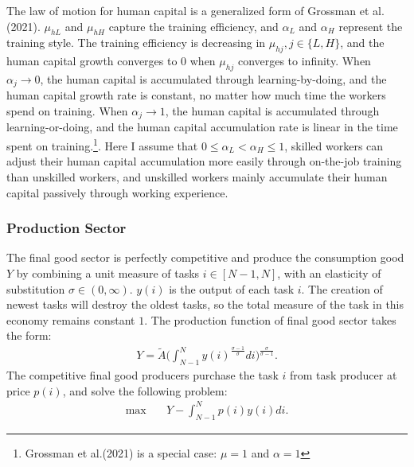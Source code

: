 \documentclass[12pt]{article}
\begin{document}
The law of motion for human capital is a generalized form of Grossman et al.(2021)\nocite{Grossmanetal2021}. $\mu_{hL}$ and $\mu_{hH}$ capture the training efficiency, and $\alpha_L$ and $\alpha_H$ represent the training style. The training efficiency is decreasing in $\mu_{hj}, j\in\{L,H\}$, and the human capital growth converges to 0 when $\mu_{hj}$ converges to infinity. When $\alpha_j \to 0$, the human capital is accumulated through learning-by-doing, and the human capital growth rate is constant, no matter how much time the workers spend on training. When $\alpha_j \to 1$, the human capital is accumulated through learning-or-doing, and the human capital accumulation rate is linear in the time spent on training.\footnote{Grossman et al.(2021) is a special case: $\mu = 1$ and $\alpha=1$}. Here I assume that $0\leq\alpha_L<\alpha_H\leq1$, skilled workers can adjust their human capital accumulation more easily through on-the-job training than unskilled workers, and unskilled workers mainly accumulate their human capital passively through working experience. 

\subsubsection*{Production Sector}

The final good sector is perfectly competitive and produce the consumption good $Y$ by combining a unit measure of tasks $i\in [N-1,N]$, with an elasticity of substitution $\sigma \in (0,\infty)$. $y(i)$ is the output of each task $i$. The creation of newest tasks will destroy the oldest tasks, so the total measure of the task in this economy remains constant $1$. The production function of final good sector takes the form:
\begin{align*}
Y = \tilde{A}\Big(\int_{N-1}^{N}y(i)^{\frac{\sigma-1}{\sigma}}di\Big)^{\frac{\sigma}{\sigma-1}}.
\end{align*}
The competitive final good producers purchase the task $i$ from task producer at price $p(i)$, and solve the following problem:
\begin{align*}
\max \quad & Y-\int_{N-1}^Np(i)y(i)di. 
\end{align*}
\end{document}

